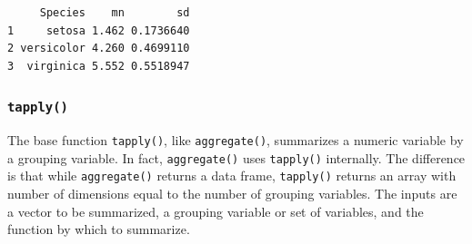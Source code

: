 \documentclass[
  13,
  letterpaper,
]{report}
\newenvironment{Shaded}{\begin{snugshade}}{\end{snugshade}}
\newcommand{\AttributeTok}[1]{\textcolor[rgb]{0.40,0.45,0.13}{#1}}
\newcommand{\CommentTok}[1]{\textcolor[rgb]{0.37,0.37,0.37}{#1}}
\newcommand{\DecValTok}[1]{\textcolor[rgb]{0.68,0.00,0.00}{#1}}
\newcommand{\DocumentationTok}[1]{\textcolor[rgb]{0.37,0.37,0.37}{\textit{#1}}}
\newcommand{\FunctionTok}[1]{\textcolor[rgb]{0.28,0.35,0.67}{#1}}
\newcommand{\NormalTok}[1]{\textcolor[rgb]{0.00,0.23,0.31}{#1}}
\newcommand{\OtherTok}[1]{\textcolor[rgb]{0.00,0.23,0.31}{#1}}
\newcommand{\SpecialCharTok}[1]{\textcolor[rgb]{0.37,0.37,0.37}{#1}}
\newcommand{\StringTok}[1]{\textcolor[rgb]{0.13,0.47,0.30}{#1}}
\begin{document}
\begin{Shaded}
\end{Shaded}

\begin{verbatim}
     Species    mn        sd
1     setosa 1.462 0.1736640
2 versicolor 4.260 0.4699110
3  virginica 5.552 0.5518947
\end{verbatim}

\subsubsection{\texorpdfstring{\texttt{tapply()}}{tapply()}}\label{tapply}

The base function \texttt{tapply()}, like \texttt{aggregate()},
summarizes a numeric variable by a grouping variable. In fact,
\texttt{aggregate()} uses \texttt{tapply()} internally. The difference
is that while \texttt{aggregate()} returns a data frame,
\texttt{tapply()} returns an array with number of dimensions equal to
the number of grouping variables. The inputs are a vector to be
summarized, a grouping variable or set of variables, and the function by
which to summarize.

\begin{Shaded}
\end{Shaded}
\end{document}
